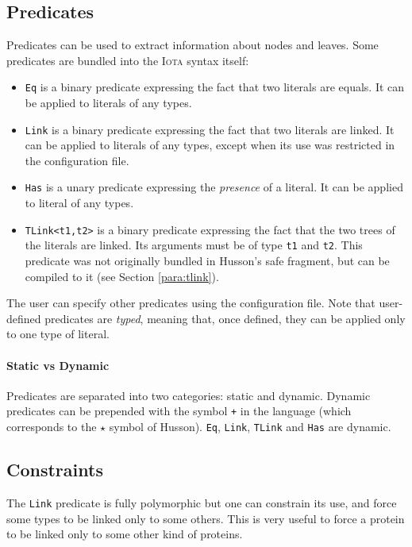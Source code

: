 \documentclass[10pt,a4paper]{article}
\newcommand\Iota{\textsc{Iota}}
\newcommand{\ocaml}{\texttt}
\begin{document}
\subsection{Predicates}
\label{subsec:predicates}
Predicates can be used to extract information about nodes and leaves. Some predicates are bundled into the \Iota{} syntax itself:
\begin{itemize}
\item \ocaml{Eq} is a binary predicate expressing the fact that two literals are equals. It can be applied to literals of any types.
\item \ocaml{Link} is a binary predicate expressing the fact that two literals are linked. It can be applied to literals of any types, except when its use was restricted in the configuration file.
\item \ocaml{Has} is a unary predicate expressing the \emph{presence} of a literal. It can be applied to literal of any types.
\item \ocaml{TLink<t1,t2>} is a binary predicate expressing the fact that the two trees of the literals are linked. Its arguments must be of type \ocaml{t1} and \ocaml{t2}. This predicate was not originally bundled in Husson's safe fragment, but can be compiled to it (see Section \ref{para:tlink}).
\end{itemize}

The user can specify other predicates using the configuration file. Note that user-defined predicates are \emph{typed}, meaning that, once defined, they can be applied only to one type of literal.

\paragraph{Static vs Dynamic}
Predicates are separated into two categories: static and dynamic. Dynamic predicates can be prepended with the symbol \ocaml{+} in the language (which corresponds to the $\star$ symbol of Husson). \ocaml{Eq}, \ocaml{Link}, \ocaml{TLink} and \ocaml{Has} are dynamic.

\subsection{Constraints}
The \ocaml{Link} predicate is fully polymorphic but one can constrain its use, and force some types to be linked only to some others. This is very useful to force a protein to be linked only to some other kind of proteins.
\end{document}
